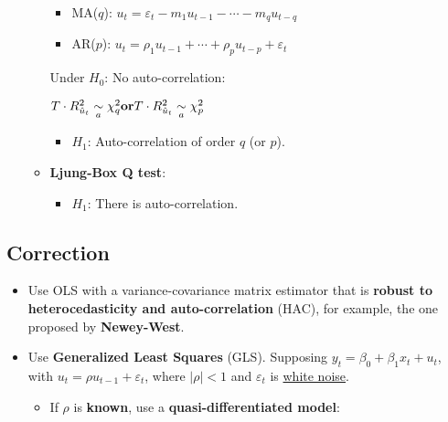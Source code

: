 \documentclass[10pt, a4paper, landscape]{article}
\begin{document}
\begin{multicols}{3}
\begin{itemize}[leftmargin=*]
\begin{itemize}[leftmargin=*]
				\begin{itemize}[leftmargin=*]
					\item MA($q$): $u_{t} = \varepsilon_{t} - m_{1} u_{t - 1} - \cdots - m_{q} u_{t - q}$
					\item AR($p$): $u_{t} = \rho_{1} u_{t - 1} + \cdots + \rho_{p} u_{t - p}+ \varepsilon_{t}$
				\end{itemize}
				
			\columnbreak
				
				Under $H_{0}$: No auto-correlation:
				
				\begin{center}
					$\hfill T \cdot R^{2}_{\hat{u}_t}\underset{a}{\sim}\chi^{2}_{q} \hfill \textbf{or} \hfill T \cdot R^{2}_{\hat{u}_t}\underset{a}{\sim}\chi^{2}_{p} \hfill$
				\end{center}
				
				\begin{itemize}[leftmargin=*]
					\item $H_{1}$: Auto-correlation of order $q$ (or $p$).
				\end{itemize}
				
				\item \textbf{Ljung-Box Q test}:
				
				\begin{itemize}[leftmargin=*]
					\item $H_{1}$: There is auto-correlation.
				\end{itemize}
			\end{itemize}
		\end{itemize}
		
		\subsection*{Correction}
		
		\begin{itemize}[leftmargin=*]
			\item Use OLS with a variance-covariance matrix estimator that is \textbf{robust to heterocedasticity and auto-correlation} (HAC), for example, the one proposed by \textbf{Newey-West}.
			\item Use \textbf{Generalized Least Squares} (GLS). Supposing $y_{t} = \beta_{0} + \beta_{1} x_{t} + u_{t}$, with $u_{t} = \rho u_{t - 1}+ \varepsilon_{t}$, where $\lvert \rho \rvert < 1$ and $\varepsilon_{t}$ is \underline{white noise}.
			
			\begin{itemize}[leftmargin=*]
				\item If $\rho$ is \textbf{known}, use a \textbf{quasi-differentiated model}:
			

\end{itemize}
\end{itemize}
\end{multicols}
\end{document}
